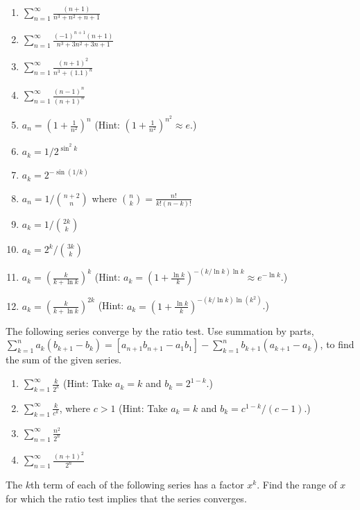 \documentclass{exercises}
\begin{document}
\begin{enumerate}[resume]
\item $\sum_{n=1}^{\infty}\frac{(n+1)}{n^{3}+n^{2}+n+1}$
\item $\sum_{n=1}^{\infty}\frac{{(-1)}^{n+1}(n+1)}{n^{3}+3n^{2}+3n+1}$
\item $\sum_{n=1}^{\infty}\frac{{(n+1)}^{2}}{n^{3}+{(1.1)}^{n}}$
\item $\sum_{n=1}^{\infty}\frac{{(n-1)}^{n}}{{(n+1)}^{n}}$
\item $a_{n}=\left(1+\frac{1}{n^{2}}\right)^{n}$ (Hint: $\left(1+\frac{1}{n^{2}}\right)^{n^{2}}\approx e$.)
\item $a_{k}=1/2^{\sin^{2}k}$
\item $a_{k}=2^{-\sin(1/k)}$
\item $a_{n}=1/\binom{n+2}{n}$ where $\binom{n}{k}=\frac{n!}{k!(n-k)!}$
\item $a_{k}=1/\binom{2k}{k}$
\item $a_{k}=2^{k}/\binom{3k}{k}$
\item $a_{k}=\left(\frac{k}{k+\ln k}\right)^{k}$ (Hint: $a_{k}=\left(1+\frac{\ln k}{k}\right)^{-(k/\ln k)\ln k}\approx e^{-\ln k}$.)
\item $a_{k}=\left(\frac{k}{k+\ln k}\right)^{2k}$ (Hint: $a_{k}=\left(1+\frac{\ln k}{k}\right)^{-(k/\ln k)\ln(k^{2})}$.)
\end{enumerate}

The following series converge by the ratio test. Use summation by parts, $\sum_{k=1}^{n}a_{k}(b_{k+1}-b_{k})=[a_{n+1}b_{n+1}-a_{1}b_{1}]-\sum_{k=1}^{n}b_{k+1}(a_{k+1}-a_{k})$, to find the sum of the given series.

\begin{enumerate}[resume]
\item $\sum_{k=1}^{\infty}\frac{k}{2^{k}}$ (Hint: Take $a_{k}=k$ and $b_{k}=2^{1-k}$.)
\item $\sum_{k=1}^{\infty}\frac{k}{c^{k}}$, where $c>1$ (Hint: Take $a_{k}=k$ and $b_{k}=c^{1-k}/(c-1)$.)
\item $\sum_{n=1}^{\infty}\frac{n^{2}}{2^{n}}$
\item $\sum_{n=1}^{\infty}\frac{{(n+1)}^{2}}{2^{n}}$
\end{enumerate}

The $k$th term of each of the following series has a factor $x^{k}$. Find the range of $x$ for which the ratio test implies that the series converges.
\end{document}
